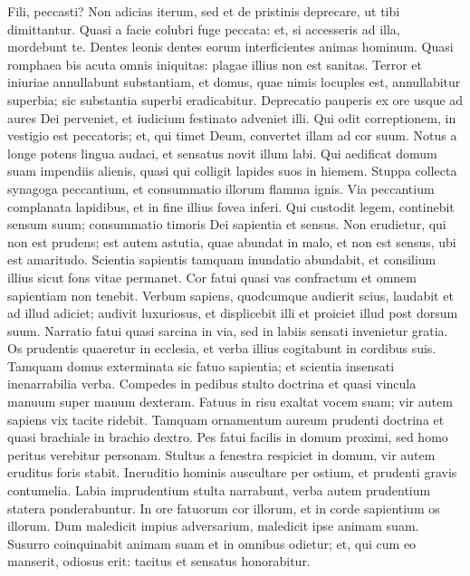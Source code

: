 \begin{biblechapter}  
\verse Fili, peccasti? Non adicias iterum, sed et de pristinis deprecare, ut tibi dimittantur. 
\verse Quasi a facie colubri fuge peccata: et, si accesseris ad illa, mordebunt te. 
\verse Dentes leonis dentes eorum interficientes animas hominum. 
\verse Quasi romphaea bis acuta omnis iniquitas: plagae illius non est sanitas. 
\verse Terror et iniuriae annullabunt substantiam, et domus, quae nimis locuples est, annullabitur superbia; sic substantia superbi eradicabitur. 
\verse Deprecatio pauperis ex ore usque ad aures Dei perveniet, et iudicium festinato adveniet illi. 
\verse Qui odit correptionem, in vestigio est peccatoris; et, qui timet Deum, convertet illam ad cor suum. 
\verse Notus a longe potens lingua audaci, et sensatus novit illum labi. 
\verse Qui aedificat domum suam impendiis alienis, quasi qui colligit lapides suos in hiemem. 
\verse Stuppa collecta synagoga peccantium, et consummatio illorum flamma ignis. 
\verse Via peccantium complanata lapidibus, et in fine illius fovea inferi. 
\verse Qui custodit legem, continebit sensum suum; 
\verse consummatio timoris Dei sapientia et sensus. 
\verse Non erudietur, qui non est prudens; 
\verse est autem astutia, quae abundat in malo, et non est sensus, ubi est amaritudo. 
\verse Scientia sapientis tamquam inundatio abundabit, et consilium illius sicut fons vitae permanet. 
\verse Cor fatui quasi vas confractum et omnem sapientiam non tenebit. 
\verse Verbum sapiens, quodcumque audierit scius, laudabit et ad illud adiciet; audivit luxuriosus, et displicebit illi et proiciet illud post dorsum suum. 
\verse Narratio fatui quasi sarcina in via, sed in labiis sensati invenietur gratia. 
\verse Os prudentis quaeretur in ecclesia, et verba illius cogitabunt in cordibus suis. 
\verse Tamquam domus exterminata sic fatuo sapientia; et scientia insensati inenarrabilia verba. 
\verse Compedes in pedibus stulto doctrina et quasi vincula manuum super manum dexteram. 
\verse Fatuus in risu exaltat vocem suam; vir autem sapiens vix tacite ridebit. 
\verse Tamquam ornamentum aureum prudenti doctrina et quasi brachiale in brachio dextro. 
\verse Pes fatui facilis in domum proximi, sed homo peritus verebitur personam. 
\verse Stultus a fenestra respiciet in domum, vir autem eruditus foris stabit. 
\verse Ineruditio hominis auscultare per ostium, et prudenti gravis contumelia. 
\verse Labia imprudentium stulta narrabunt, verba autem prudentium statera ponderabuntur. 
\verse In ore fatuorum cor illorum, et in corde sapientium os illorum. 
\verse Dum maledicit impius adversarium, maledicit ipse animam suam. 
\verse Susurro coinquinabit animam suam et in omnibus odietur; et, qui cum eo manserit, odiosus erit: tacitus et sensatus honorabitur. 
\end{biblechapter}

